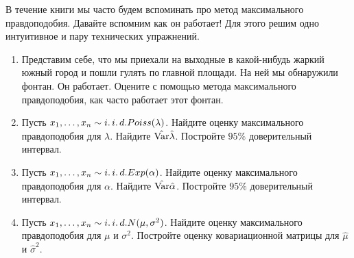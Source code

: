 \begin{problem} 
В течение книги мы часто будем вспоминать про метод максимального правдоподобия. Давайте вспомним как он работает!  Для этого решим одно интуитивное и пару технических упражнений. 

\begin{enumerate}
	\item Представим себе, что мы приехали на выходные в какой-нибудь жаркий южный город и пошли гулять по главной площади. На ней мы обнаружили фонтан. Он работает. Оцените с помощью метода максимального правдоподобия, как часто работает этот фонтан. 
	
	\item  Пусть $x_1, \ldots, x_n   \sim i.\,i.\,d.  Poiss(\lambda)$. Найдите оценку максимального правдоподобия для $\lambda$.  Найдите $\hat{\operatorname{Var}}{\hat \lambda}$. Постройте $95\%$ доверительный интервал. 

	\item  Пусть $x_1, \ldots, x_n   \sim i.\,i.\,d.  Exp(\alpha)$. Найдите оценку максимального правдоподобия для $\alpha$.  Найдите $\hat{\operatorname{Var}}{\hat \alpha}$. Постройте $95\%$ доверительный интервал. 
	
	\item Пусть $x_1, \ldots, x_n   \sim i.\,i.\,d.  N(\mu, \sigma^2)$. Найдите оценку максимального правдоподобия для $\mu$ и $\sigma^2$.  Постройте оценку ковариационной матрицы для $\hat \mu$ и $\hat \sigma^2$. 

\end{enumerate}
\end{problem}

